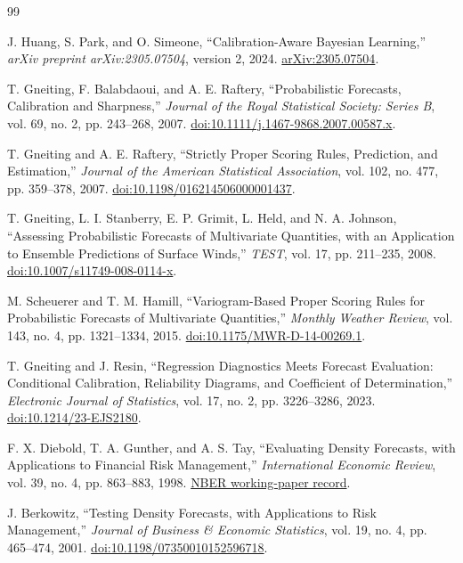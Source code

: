 \documentclass[11pt]{article}
\begin{document}
\begin{thebibliography}{99}

J. Huang, S. Park, and O. Simeone,
``Calibration-Aware Bayesian Learning,''
\emph{arXiv preprint arXiv:2305.07504}, version 2, 2024.
\href{https://arxiv.org/abs/2305.07504}{arXiv:2305.07504}.

T. Gneiting, F. Balabdaoui, and A. E. Raftery,
``Probabilistic Forecasts, Calibration and Sharpness,''
\emph{Journal of the Royal Statistical Society: Series B},
vol. 69, no. 2, pp. 243--268, 2007.
\href{https://doi.org/10.1111/j.1467-9868.2007.00587.x}{doi:10.1111/j.1467-9868.2007.00587.x}.

T. Gneiting and A. E. Raftery,
``Strictly Proper Scoring Rules, Prediction, and Estimation,''
\emph{Journal of the American Statistical Association},
vol. 102, no. 477, pp. 359--378, 2007.
\href{https://doi.org/10.1198/016214506000001437}{doi:10.1198/016214506000001437}.

T. Gneiting, L. I. Stanberry, E. P. Grimit, L. Held, and N. A. Johnson,
``Assessing Probabilistic Forecasts of Multivariate Quantities, with an
Application to Ensemble Predictions of Surface Winds,''
\emph{TEST}, vol. 17, pp. 211--235, 2008.
\href{https://doi.org/10.1007/s11749-008-0114-x}{doi:10.1007/s11749-008-0114-x}.

M. Scheuerer and T. M. Hamill,
``Variogram-Based Proper Scoring Rules for Probabilistic Forecasts of
Multivariate Quantities,''
\emph{Monthly Weather Review}, vol. 143, no. 4, pp. 1321--1334, 2015.
\href{https://doi.org/10.1175/MWR-D-14-00269.1}{doi:10.1175/MWR-D-14-00269.1}.

T. Gneiting and J. Resin,
``Regression Diagnostics Meets Forecast Evaluation: Conditional Calibration,
Reliability Diagrams, and Coefficient of Determination,''
\emph{Electronic Journal of Statistics}, vol. 17, no. 2,
pp. 3226--3286, 2023.
\href{https://doi.org/10.1214/23-EJS2180}{doi:10.1214/23-EJS2180}.

F. X. Diebold, T. A. Gunther, and A. S. Tay,
``Evaluating Density Forecasts, with Applications to Financial Risk
Management,'' \emph{International Economic Review}, vol. 39, no. 4,
pp. 863--883, 1998.
\href{https://www.nber.org/papers/t0215}{NBER working-paper record}.

J. Berkowitz,
``Testing Density Forecasts, with Applications to Risk Management,''
\emph{Journal of Business \& Economic Statistics}, vol. 19, no. 4,
pp. 465--474, 2001.
\href{https://doi.org/10.1198/07350010152596718}{doi:10.1198/07350010152596718}.


\end{thebibliography}
\end{document}
